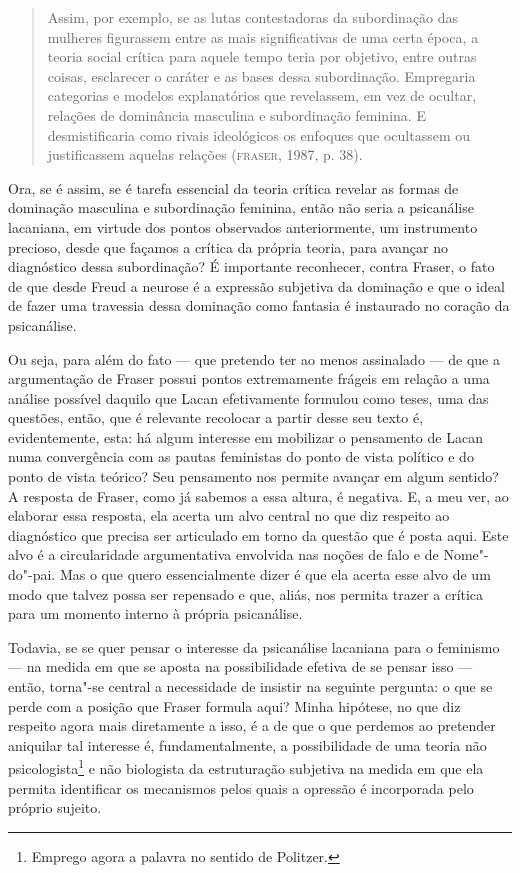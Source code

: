 \begin{quote}
Assim, por exemplo, se as lutas contestadoras da subordinação das
mulheres figurassem entre as mais significativas de uma certa época, a
teoria social crítica para aquele tempo teria por objetivo, entre outras
coisas, esclarecer o caráter e as bases dessa subordinação. Empregaria
categorias e modelos explanatórios que revelassem, em vez de ocultar,
relações de dominância masculina e subordinação feminina. E
desmistificaria como rivais ideológicos os enfoques que ocultassem ou
justificassem aquelas relações (\textsc{fraser}, 1987, p. 38).
\end{quote}

Ora, se é assim, se é tarefa essencial da teoria crítica revelar as
formas de dominação masculina e subordinação feminina, então não seria a
psicanálise lacaniana, em virtude dos pontos observados anteriormente,
um instrumento precioso, desde que façamos a crítica da própria teoria,
para avançar no diagnóstico dessa subordinação? É importante reconhecer,
contra Fraser, o fato de que desde Freud a neurose é a expressão
subjetiva da dominação e que o ideal de fazer uma travessia dessa
dominação como fantasia é instaurado no coração da psicanálise.

Ou seja, para além do fato --- que pretendo ter ao menos assinalado --- de
que a argumentação de Fraser possui pontos extremamente frágeis em
relação a uma análise possível daquilo que Lacan efetivamente formulou
como teses, uma das questões, então, que é relevante recolocar a partir
desse seu texto é, evidentemente, esta: há algum interesse em mobilizar
o pensamento de Lacan numa convergência com as pautas feministas do
ponto de vista político e do ponto de vista teórico? Seu pensamento nos
permite avançar em algum sentido? A resposta de Fraser, como já sabemos
a essa altura, é negativa. E, a meu ver, ao elaborar essa resposta, ela
acerta um alvo central no que diz respeito ao diagnóstico que precisa
ser articulado em torno da questão que é posta aqui. Este alvo é a
circularidade argumentativa envolvida nas noções de falo e de
Nome"-do"-pai. Mas o que quero essencialmente dizer é que ela acerta esse
alvo de um modo que talvez possa ser repensado e que, aliás, nos permita
trazer a crítica para um momento interno à própria psicanálise.

Todavia, se se quer pensar o interesse da psicanálise lacaniana para o
feminismo --- na medida em que se aposta na possibilidade efetiva de se
pensar isso --- então, torna"-se central a necessidade de insistir na
seguinte pergunta: o que se perde com a posição que Fraser formula aqui?
Minha hipótese, no que diz respeito agora mais diretamente a isso, é a
de que o que perdemos ao pretender aniquilar tal interesse é,
fundamentalmente, a possibilidade de uma teoria não
psicologista\footnote{Emprego agora a palavra no sentido de Politzer.} e
não biologista da estruturação subjetiva na medida em que ela permita
identificar os mecanismos pelos quais a opressão é incorporada pelo
próprio sujeito.

